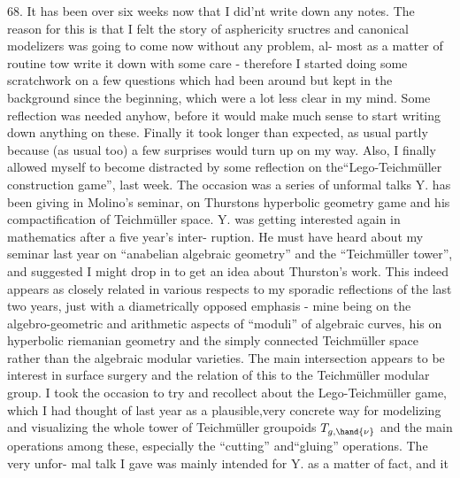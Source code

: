 68. It has been over six weeks now that I did'nt write down any notes.
The reason for this is that I felt the story of asphericity sructres
and canonical modelizers was going to come now without any problem, al-%
most as a matter of routine tow write it down with some care - therefore
I started doing some scratchwork on a few questions which had been around
but kept in the background since the beginning,  which were a lot less
clear in my mind. Some reflection  was needed anyhow, before it
would make much sense to start writing down anything on these. Finally it
took longer than expected, as usual\unsure{\deleted{,}}\hand{-} partly because (as usual\deleted{,} too\hand{!}) a
few surprises would turn up on my way. Also, I finally allowed myself to
become distracted by some reflection on the``Lego-Teichmüller construction
game'',   last week. The occasion was a series of  unformal
talks Y. has been giving in Molino's seminar, on Thurstons 
hyperbolic geometry game and his compactification of Teichmüller space.
Y. was getting interested again in mathematics after a five year's inter-%
ruption. He must have heard about my seminar last year on ``anabelian
algebraic geometry'' and the ``Teichmüller tower'', and suggested I might
drop in to get an idea about Thurston's work. This  indeed appears as 
\margin{$\ast$} closely related in various respects to my sporadic reflections\hand{$\ast$} of the last
two years, just with a diametrically opposed emphasis - mine being on
the algebro-geometric and arithmetic aspects of ``moduli'' of algebraic
curves, his on hyperbolic riemanian geometry and the simply connected
 Teichmüller space\unsure{\deleted{,}} \hand{(}rather than the algebraic modular varieties\hand{)}. The main
intersection appears to be interest in surface surgery and the relation of
this to the Teichmüller modular group. I took the occasion to try and
recollect about the Lego-Teichmüller game, which I had thought of last
year as a plausible,very concrete way for modelizing and visualizing the
whole tower of Teichmüller groupoids $T_{g,\hand{\nu}}$ and the main operations among
these, especially the ``cutting'' and``gluing'' operations. The very unfor-%
mal talk I gave was mainly intended for Y. as a matter of fact, and it

